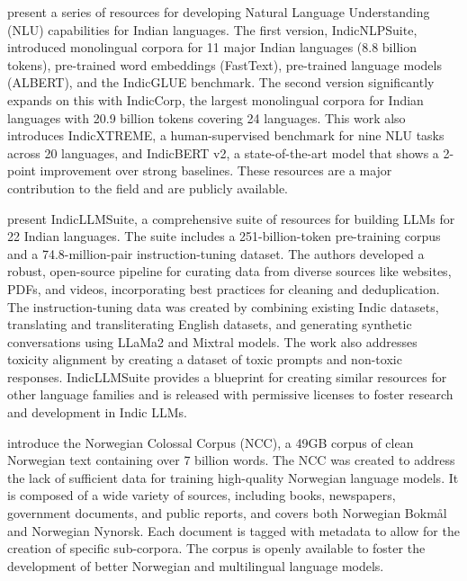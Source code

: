 \documentclass[acmsmall]{acmart}
\begin{document}
\citep{kakwani-etal-2020-indicnlpsuite} \citep{doddapaneni2023leavingindiclanguagebehind} present a series of resources for developing Natural Language Understanding (NLU) capabilities for Indian languages. The first version, IndicNLPSuite, introduced monolingual corpora for 11 major Indian languages (8.8 billion tokens), pre-trained word embeddings (FastText), pre-trained language models (ALBERT), and the IndicGLUE benchmark. The second version significantly expands on this with IndicCorp, the largest monolingual corpora for Indian languages with 20.9 billion tokens covering 24 languages. This work also introduces IndicXTREME, a human-supervised benchmark for nine NLU tasks across 20 languages, and IndicBERT v2, a state-of-the-art model that shows a 2-point improvement over strong baselines. These resources are a major contribution to the field and are publicly available.




 \citep{Khan_2024} present IndicLLMSuite, a comprehensive suite of resources for building LLMs for 22 Indian languages. The suite includes a 251-billion-token pre-training corpus and a 74.8-million-pair instruction-tuning dataset. The authors developed a robust, open-source pipeline for curating data from diverse sources like websites, PDFs, and videos, incorporating best practices for cleaning and deduplication. The instruction-tuning data was created by combining existing Indic datasets, translating and transliterating English datasets, and generating synthetic conversations using LLaMa2 and Mixtral models. The work also addresses toxicity alignment by creating a dataset of toxic prompts and non-toxic responses. IndicLLMSuite provides a blueprint for creating similar resources for other language families and is released with permissive licenses to foster research and development in Indic LLMs.

 \citep{kummervold-etal-2022-norwegian} introduce the Norwegian Colossal Corpus (NCC), a 49GB corpus of clean Norwegian text containing over 7 billion words. The NCC was created to address the lack of sufficient data for training high-quality Norwegian language models. It is composed of a wide variety of sources, including books, newspapers, government documents, and public reports, and covers both Norwegian Bokmål and Norwegian Nynorsk. Each document is tagged with metadata to allow for the creation of specific sub-corpora. The corpus is openly available to foster the development of better Norwegian and multilingual language models.
 
\end{document}

